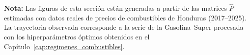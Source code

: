 \vspace{1em}
\noindent\textbf{Nota:} Las figuras de esta sección están generadas 
a partir de las matrices $\hat{P}$ estimadas con datos reales de 
precios de combustibles de Honduras (2017--2025). La trayectoria 
observada corresponde a la serie de la Gasolina~Super procesada con 
los hiperparámetros óptimos obtenidos en el Capítulo~\ref{cap:regimenes_combustibles}.
